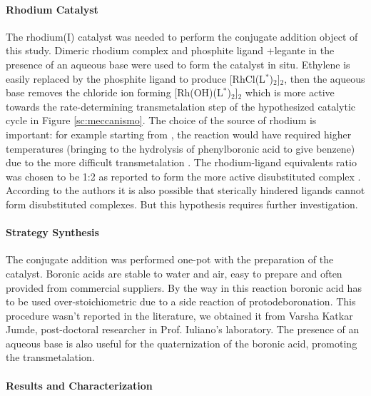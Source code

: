 \paragraph{Rhodium Catalyst}
  The rhodium(I) catalyst was needed to perform the conjugate addition object of this study. Dimeric rhodium complex  and phosphite ligand \cmpd+{legante} in the presence of an aqueous base were used to form the catalyst in situ. Ethylene is easily replaced by the phosphite ligand to produce [RhCl(L$^\ast$)$_2$]$_2$, then the aqueous base removes the chloride ion forming [Rh(OH)(L$^\ast$)$_2$]$_2$ which is more active towards the rate-determining transmetalation step of the hypothesized catalytic cycle in Figure \ref{sc:meccanismo}. 
  The choice of the source of rhodium is important: for example starting from , the reaction would have required higher temperatures (bringing to the hydrolysis of phenylboronic acid to give benzene) due to the more difficult transmetalation \cite{Hayashi2002}. 
  The rhodium-ligand equivalents ratio was chosen to be 1:2 as reported to form the more active disubstituted complex \cite{Facchetti2009}. According to the authors it is also possible that sterically hindered ligands cannot form disubstituted complexes. But this hypothesis requires further investigation.
  \paragraph{Strategy Synthesis}
    The conjugate addition was performed one-pot with the preparation of the catalyst.
    Boronic acids are stable to water and air, easy to prepare and often provided from commercial suppliers. By the way in this reaction boronic acid has to be used over-stoichiometric due to a side reaction of proto\-de\-boronation.
    This procedure wasn't reported in the literature, we obtained it from Varsha Katkar Jumde, post-doctoral researcher in Prof. Iuliano's laboratory.     
    The presence of an aqueous base is also useful for the quaternization of the boronic acid, promoting the transmetalation.


\paragraph{Results and Characterization}

